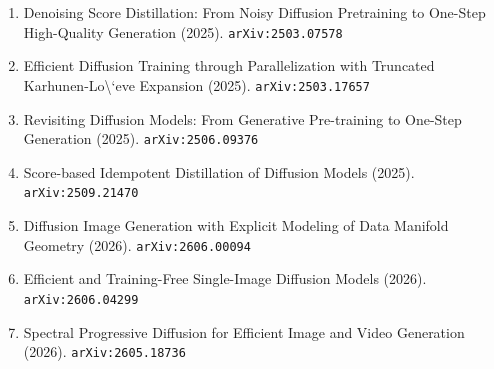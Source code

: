 \documentclass[11pt]{article}
\begin{document}
\begin{enumerate}
  \item Denoising Score Distillation: From Noisy Diffusion Pretraining to One-Step High-Quality Generation (2025). \texttt{arXiv:2503.07578}
  \item Efficient Diffusion Training through Parallelization with Truncated Karhunen-Lo\textbackslash{}`eve Expansion (2025). \texttt{arXiv:2503.17657}
  \item Revisiting Diffusion Models: From Generative Pre-training to One-Step Generation (2025). \texttt{arXiv:2506.09376}
  \item Score-based Idempotent Distillation of Diffusion Models (2025). \texttt{arXiv:2509.21470}
  \item Diffusion Image Generation with Explicit Modeling of Data Manifold Geometry (2026). \texttt{arXiv:2606.00094}
  \item Efficient and Training-Free Single-Image Diffusion Models (2026). \texttt{arXiv:2606.04299}
  \item Spectral Progressive Diffusion for Efficient Image and Video Generation (2026). \texttt{arXiv:2605.18736}
\end{enumerate}
\end{document}
